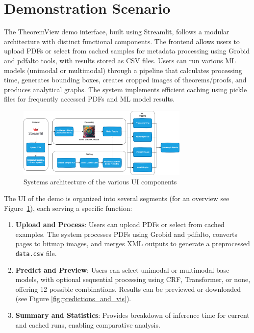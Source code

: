 \documentclass[runningheads]{llncs}
\begin{document}
\section{Demonstration Scenario}

The TheoremView demo interface, built using Streamlit, follows a modular architecture with distinct functional components. The frontend allows users to upload PDFs or select from cached samples for metadata processing using Grobid and pdfalto tools, with results stored as CSV files. Users can run various ML models (unimodal or multimodal) through a pipeline that calculates processing time, generates bounding boxes, creates cropped images of theorems/proofs, and produces analytical graphs. The system implements efficient caching using pickle files for frequently accessed PDFs and ML model results.

\begin{figure}[h]
    \centering
    \includegraphics[width=0.75\textwidth]{images/sys-demo-arch.png}
    \caption{Systems architecture of the various UI components
    }
    \label{fig:system-arch}
\end{figure}

The UI of the demo is organized into several segments (for an overview see Figure~\ref{fig:system-arch}), each serving a specific function:

\begin{enumerate}
    \item \textbf{Upload and Process}: Users can upload PDFs or select from cached examples. The system processes PDFs using Grobid and pdfalto, converts pages to bitmap images, and merges XML outputs to generate a preprocessed \texttt{data.csv} file.

    \item \textbf{Predict and Preview}: Users can select unimodal or multimodal base models, with optional sequential processing using CRF, Transformer, or none, offering 12 possible combinations. Results can be previewed or downloaded (see Figure \ref{fig:predictions_and_vis}).

    \item \textbf{Summary and Statistics}: Provides breakdown of inference time for current and cached runs, enabling comparative analysis.
\end{enumerate}
\end{document}
